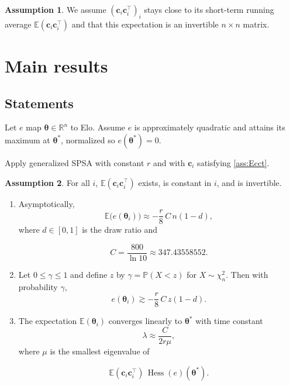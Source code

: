 \documentclass[11pt]{article}
\providecommand{\Cref}[1]{\autoref{#1}}
\theoremstyle{plain}
\theoremstyle{definition}
\newtheorem{assumption}{Assumption}
\theoremstyle{remark}
\newcommand{\R}{\mathbb{R}}
\newcommand{\E}{\mathbb{E}}
\newcommand{\Prob}{\mathbb{P}}
\DeclareMathOperator{\Hess}{Hess}
\begin{document}
\begin{assumption}
We assume $(\bm{c}_i\bm{c}_i^\top)_i$ stays close to its short-term running
average $\E(\bm{c}_i\bm{c}_i^\top)$ and that this expectation is an invertible
$n\times n$ matrix.
\end{assumption}

\section{Main results}

\subsection{Statements}

Let $e$ map $\bm{\theta}\in\R^n$ to Elo. Assume $e$ is approximately quadratic
and attains its maximum at $\bm{\theta}^\ast$, normalized so
$e(\bm{\theta}^\ast)=0$.

Apply generalized SPSA with constant $r$ and with $\bm{c}_i$ satisfying
\Cref{ass:Ecct}.

\begin{assumption}\label{ass:Ecct}
For all $i$, $\E(\bm{c}_i\bm{c}_i^\top)$ exists, is constant in $i$, and is
invertible.
\end{assumption}

\begin{enumerate}
\item Asymptotically,
\begin{equation}
  \E\bigl(e(\bm{\theta}_i)\bigr)
  \approx -\frac{r}{8}\,C\,n(1-d),
  \label{eq:main1}
\end{equation}
where $d\in[0,1]$ is the draw ratio and

\[
  C=\frac{800}{\ln 10}\approx 347.43558552.
\]

\item Let $0\le\gamma\le1$ and define $z$ by $\gamma=\Prob(X<z)$ for
$X\sim\chi^2_n$. Then with probability $\gamma$,
\begin{equation}
  e(\bm{\theta}_i)\gtrsim -\frac{r}{8}\,C\,z(1-d).
  \label{eq:main2}
\end{equation}

\item The expectation $\E(\bm{\theta}_i)$ converges linearly to
$\bm{\theta}^\ast$ with time constant
\begin{equation}
  \lambda\approx\frac{C}{2r\mu},
  \label{eq:lambda}
\end{equation}
where $\mu$ is the smallest eigenvalue of

\[
  \E(\bm{c}_i\bm{c}_i^\top)\,\Hess(e)(\bm{\theta}^\ast).
\]
\end{enumerate}
\end{document}
